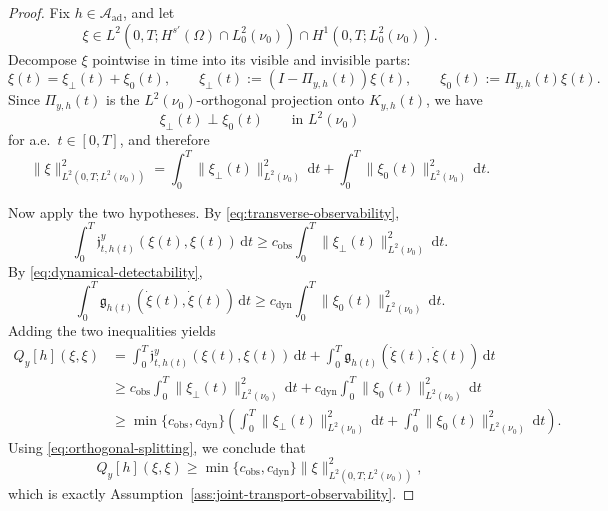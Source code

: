\documentclass{article}
\theoremstyle{definition}
\renewcommand{\d}{\mathrm{d}}
\begin{document}
\begin{proof}
    Fix \(h\in \mathcal A_{\mathrm{ad}}\), and let
    \[
        \xi\in L^2(0,T;H^{s'}(\Omega)\cap L^2_0(\nu_0))
        \cap H^1(0,T;L^2_0(\nu_0)).
    \]
    Decompose \(\xi\) pointwise in time into its visible and invisible parts:
    \[
        \xi(t)=\xi_\perp(t)+\xi_0(t),
        \qquad
        \xi_\perp(t):=(I-\Pi_{y,h}(t))\xi(t),
        \qquad
        \xi_0(t):=\Pi_{y,h}(t)\xi(t).
    \]
    Since \(\Pi_{y,h}(t)\) is the \(L^2(\nu_0)\)-orthogonal projection onto \(K_{y,h}(t)\), we have
    \[
        \xi_\perp(t)\perp \xi_0(t)
        \qquad\text{in }L^2(\nu_0)
    \]
    for a.e.\ \(t\in[0,T]\), and therefore
    \begin{equation}
        \label{eq:orthogonal-splitting}
        \|\xi\|_{L^2(0,T;L^2(\nu_0))}^2
        =
        \int_0^T \|\xi_\perp(t)\|_{L^2(\nu_0)}^2\,\d t
        +
        \int_0^T \|\xi_0(t)\|_{L^2(\nu_0)}^2\,\d t.
    \end{equation}

    Now apply the two hypotheses. By \eqref{eq:transverse-observability},
    \[
        \int_0^T \mathfrak j_{t,h(t)}^{y}(\xi(t),\xi(t))\,\d t
        \ge
        c_{\mathrm{obs}}
        \int_0^T \|\xi_\perp(t)\|_{L^2(\nu_0)}^2\,\d t.
    \]
    By \eqref{eq:dynamical-detectability},
    \[
        \int_0^T \mathfrak g_{h(t)}(\dot\xi(t),\dot\xi(t))\,\d t
        \ge
        c_{\mathrm{dyn}}
        \int_0^T \|\xi_0(t)\|_{L^2(\nu_0)}^2\,\d t.
    \]
    Adding the two inequalities yields
    \begin{align*}
        Q_y[h](\xi,\xi)
         & =
        \int_0^T \mathfrak j_{t,h(t)}^{y}(\xi(t),\xi(t))\,\d t
        +
        \int_0^T \mathfrak g_{h(t)}(\dot\xi(t),\dot\xi(t))\,\d t \\
         & \ge
        c_{\mathrm{obs}}
        \int_0^T \|\xi_\perp(t)\|_{L^2(\nu_0)}^2\,\d t
        +
        c_{\mathrm{dyn}}
        \int_0^T \|\xi_0(t)\|_{L^2(\nu_0)}^2\,\d t               \\
         & \ge
        \min\{c_{\mathrm{obs}},c_{\mathrm{dyn}}\}
        \left(
        \int_0^T \|\xi_\perp(t)\|_{L^2(\nu_0)}^2\,\d t
        +
        \int_0^T \|\xi_0(t)\|_{L^2(\nu_0)}^2\,\d t
        \right).
    \end{align*}
    Using \eqref{eq:orthogonal-splitting}, we conclude that
    \[
        Q_y[h](\xi,\xi)
        \ge
        \min\{c_{\mathrm{obs}},c_{\mathrm{dyn}}\}
        \|\xi\|_{L^2(0,T;L^2(\nu_0))}^2,
    \]
    which is exactly Assumption~\ref{ass:joint-transport-observability}.
\end{proof}
\end{document}
